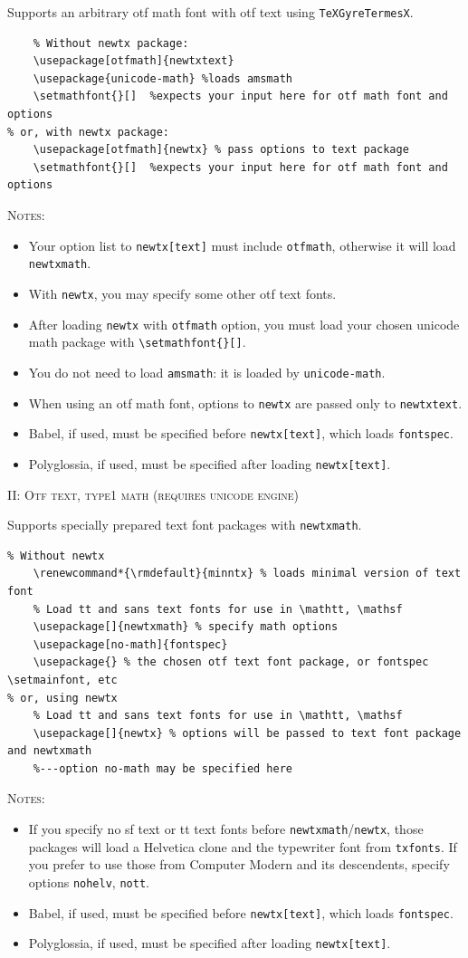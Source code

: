 \documentclass[\fsc]{article}
\theoremstyle{oldplain}
\theoremstyle{plain}
\begin{document}
Supports an arbitrary otf math font with otf text using {\tt TeXGyreTermesX}.
\begin{verbatim}
	% Without newtx package:
    \usepackage[otfmath]{newtxtext}
    \usepackage{unicode-math} %loads amsmath
    \setmathfont{}[]  %expects your input here for otf math font and options
% or, with newtx package:
    \usepackage[otfmath]{newtx} % pass options to text package
    \setmathfont{}[]  %expects your input here for otf math font and options
\end{verbatim}
\textsc{Notes:}
\begin{itemize}
\item Your option list to {\tt newtx[text]} must include {\tt otfmath}, otherwise it will load {\tt newtxmath}. 
\item With {\tt newtx}, you may specify some other otf text fonts.
\item After loading {\tt newtx} with {\tt otfmath} option, you must load your chosen unicode math package with \verb|\setmathfont{}[]|.
\item
You do not need to load {\tt amsmath}: it is loaded by {\tt unicode-math}.
\item When using an otf math font, options to {\tt newtx} are passed only to {\tt newtxtext}.

\item Babel, if used, must be specified before {\tt newtx[text]}, which loads {\tt fontspec}.
\item Polyglossia, if used, must be specified after loading {\tt newtx[text]}.
\end{itemize}

\textsc{II: Otf text, type1 math (requires unicode engine)}

Supports specially prepared text font packages with {\tt newtxmath}.
\begin{verbatim}
% Without newtx
    \renewcommand*{\rmdefault}{minntx} % loads minimal version of text font
    % Load tt and sans text fonts for use in \mathtt, \mathsf   
    \usepackage[]{newtxmath} % specify math options
    \usepackage[no-math]{fontspec}
    \usepackage{} % the chosen otf text font package, or fontspec \setmainfont, etc
% or, using newtx
    % Load tt and sans text fonts for use in \mathtt, \mathsf
    \usepackage[]{newtx} % options will be passed to text font package and newtxmath
    %---option no-math may be specified here
\end{verbatim}
\textsc{Notes:}
\begin{itemize}
\item If you specify no sf text or tt text fonts before {\tt newtxmath}/{\tt newtx}, those packages will load a Helvetica clone and the typewriter font from {\tt txfonts}. If you prefer to use those from Computer Modern and its descendents, specify options {\tt nohelv}, {\tt nott}.
\item Babel, if used, must be specified before {\tt newtx[text]}, which loads {\tt fontspec}.
\item Polyglossia, if used, must be specified after loading {\tt newtx[text]}.
\end{itemize}
\end{document}
